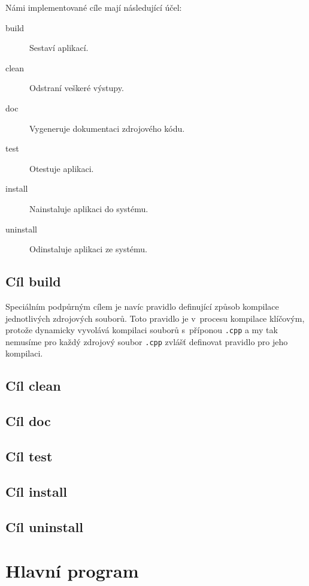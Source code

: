 \documentclass[thesis=B,czech,hidelinks]{thesis}[2012/06/26]
\begin{document}
Námi implementované cíle mají následující účel:

\begin{description}
	\item[build] Sestaví aplikací.
	\item[clean] Odstraní veškeré výstupy.
	\item[doc] Vygeneruje dokumentaci zdrojového kódu.
	\item[test] Otestuje aplikaci.
	\item[install] Nainstaluje aplikaci do systému.
	\item[uninstall] Odinstaluje aplikaci ze systému.
\end{description}

\subsection{Cíl build}

Speciálním podpůrným cílem je navíc pravidlo definující způsob kompilace jednotlivých zdrojových souborů. Toto pravidlo je v~procesu kompilace klíčovým, protože dynamicky vyvolává kompilaci souborů s~příponou \texttt{.cpp} a my tak nemusíme pro každý zdrojový soubor \texttt{.cpp} zvlášť definovat pravidlo pro jeho kompilaci.

\subsection{Cíl clean}

\subsection{Cíl doc}

\subsection{Cíl test}

\subsection{Cíl install}

\subsection{Cíl uninstall}

\section{Hlavní program}
\end{document}
